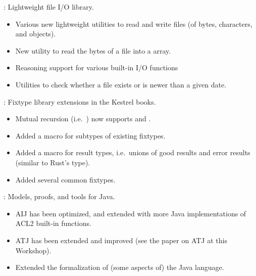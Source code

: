 
\begin{frame}

\implibtitle

:
Lightweight file I/O library.
\begin{itemize}
\item Various new lightweight utilities to read and write files
      (of bytes, characters, and objects).
\item New utility to read the bytes of a file into a  array.
\item Reasoning support for various built-in I/O functions
\item Utilities to check whether a file exists or is newer than a given date.
\end{itemize}

\end{frame}


\begin{frame}

\implibtitle

:
Fixtype library extensions in the Kestrel books.
\begin{itemize}
\item Mutual recursion (i.e.\ )
      now supports  and .
\item Added a macro  for subtypes of existing fixtypes.
\item Added a macro  for result types,
      i.e.\ unions of good results and error results
      (similar to Rust's  type).
\item Added several common fixtypes.
\end{itemize}

\end{frame}


\begin{frame}

\implibtitle

:
Models, proofs, and tools for Java.
\begin{itemize}
\item AIJ has been optimized,
      and extended with more Java implementations of ACL2 built-in functions.
\item ATJ has been extended and improved
      (see the paper on ATJ at this Workshop).
\item Extended the formalization of (some aspects of) the Java language.
\end{itemize}

\end{frame}

